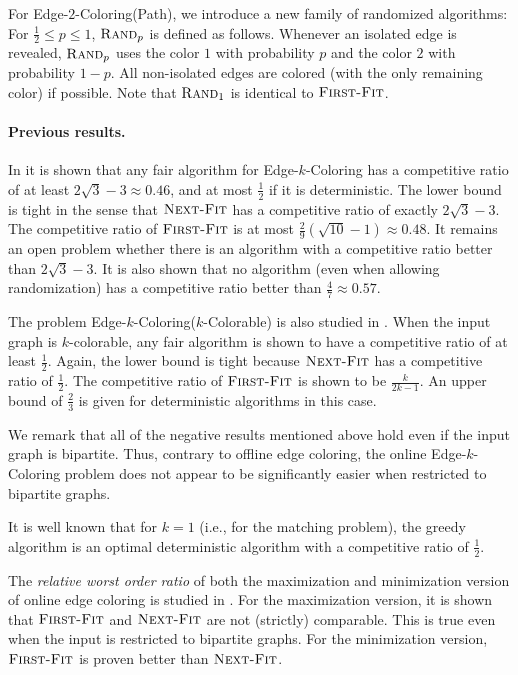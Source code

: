 \documentclass[smallextended]{svjour3}
\def\mck{{\sc Edge-$k$-Coloring}\xspace}
\def\mcpath{{\sc Edge-$2$-Coloring(Path)}\xspace}
\def\mckcol{{\sc Edge-$k$-Coloring($k$-Colorable)}\xspace}
\newcommand{\NF}{\ensuremath{\operatorname{\textsc{Next-Fit}}}\xspace}
\newcommand{\FF}{\ensuremath{\operatorname{\textsc{First-Fit}}}\xspace}
\newcommand{\RP}{\ensuremath{\operatorname{\textsc{Rand}}}\xspace}
\begin{document}
For \mcpath, we introduce a new family of randomized algorithms:
For $\frac12 \leq p\leq 1$, $\RP_p$ is defined as follows.
Whenever an isolated edge is revealed, $\RP_p$ uses the color $1$ with
 probability $p$ and the color $2$ with probability $1-p$. 
All non-isolated edges are colored (with the only remaining color) if
 possible.
Note that $\RP_1$ is identical to \FF.

\paragraph{Previous results.}
In \cite{kedge} it is shown that any fair algorithm for \mck has a competitive ratio of at least $2\sqrt{3}-3\approx 0.46$, and at most $\frac{1}{2}$ if it is deterministic. The lower bound is tight in the sense that \NF has a competitive ratio of exactly $2\sqrt{3}-3$. The competitive ratio of \FF is at most $\frac29(\sqrt{10}-1) \approx 0.48$. It remains an open problem whether there is an algorithm with a competitive ratio better than $2\sqrt{3}-3$.
It is also shown that no algorithm (even when
allowing randomization) has a competitive ratio better than $\frac47
\approx 0.57$.

The problem \mckcol is also studied in \cite{kedge}. When the input graph is $k$-colorable, any fair algorithm is shown to have a competitive ratio of at least $\frac12$. Again, the lower bound is tight because \NF has a competitive ratio of $\frac12$. The competitive ratio of \FF is shown to be $\frac{k}{2k-1}$. An upper bound of $\frac23$ is given for deterministic algorithms in this case. 

We remark that all of the negative results mentioned above hold even if the input graph is bipartite. Thus, contrary to offline edge coloring, the online \mck problem does not appear to be significantly easier when restricted to bipartite graphs.

It is well known that for $k=1$ (i.e., for the matching problem), the greedy algorithm is an optimal deterministic algorithm with a competitive ratio of $\frac12$.

The {\em relative worst order ratio} \cite{WRdefinition,boyar2007relative} of both the maximization and minimization version of online edge coloring is studied in \cite{kedge2}. For the maximization version, it is shown that \FF and \NF are not (strictly) comparable. This is true even when the input is restricted to bipartite graphs. For the minimization version, \FF is proven better than \NF.
\end{document}
